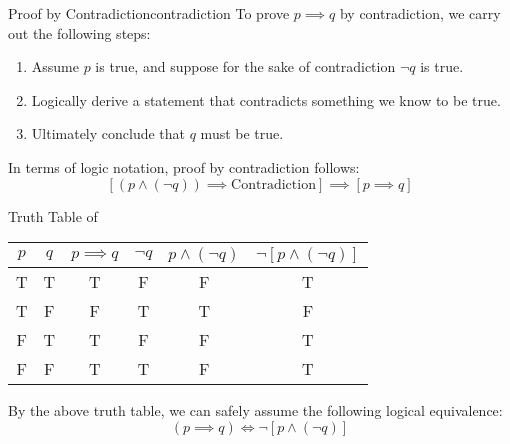 

\begin{tecbox}{Proof by Contradiction}{contradiction}
    To prove $p \implies q$ by contradiction, we carry out the following steps:
    \begin{enumerate}
        \item Assume $p$ is true, and suppose for the sake of contradiction $\neg q$ is true.
        \item Logically derive a statement that contradicts something we know to be true.
        \item Ultimately conclude that $q$ must be true.
    \end{enumerate}
\end{tecbox}

In terms of logic notation, proof by contradiction follows:
\[ \left[ \left( p \land (\neg q) \right) \implies \text{Contradiction} \right] \implies \left[ p \implies q \right]\]

\begin{exbox}{Truth Table of }{}
    \begin{center}\begin{tabular}{c | c || c | c | c | c }
        $p$ & $q$ & $p \implies q$ & $\neg q$ & $p \land (\neg q)$ & $\neg \left[ p \land (\neg q) \right]$ \\ \hline
        T & T & T & F & F & T \\
        T & F & F & T & T & F \\
        F & T & T & F & F & T \\
        F & F & T & T & F & T
    \end{tabular}\end{center}
\end{exbox}

By the above truth table, we can safely assume the following logical equivalence:
\[ (p \implies q) \iff \neg \left[ p \land (\neg q) \right] \]

